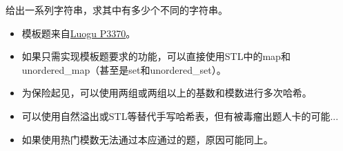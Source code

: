 \noindent 给出一系列字符串，求其中有多少个不同的字符串。

\begin{itemize}
    \item 模板题来自\href{https://www.luogu.com.cn/problem/P3370}{Luogu P3370}。
    \item 如果只需实现模板题要求的功能，可以直接使用STL中的map和unordered\_map（甚至是set和unordered\_set）。
    \item 为保险起见，可以使用两组或两组以上的基数和模数进行多次哈希。
    \item 可以使用自然溢出或STL等替代手写哈希表，但有被毒瘤出题人卡的可能...
    \item 如果使用热门模数无法通过本应通过的题，原因可能同上。
\end{itemize}